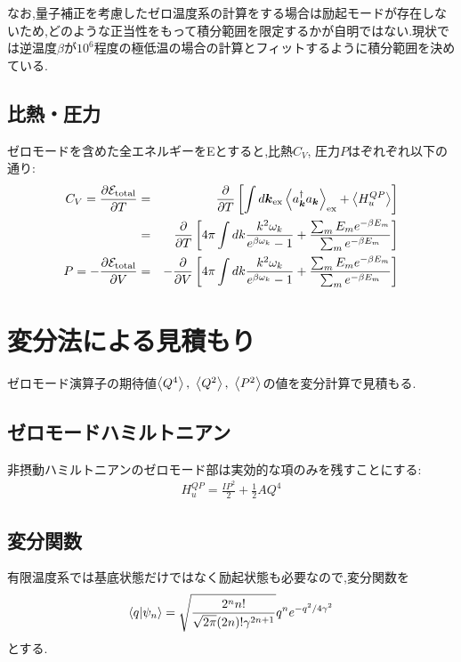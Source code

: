 \documentclass[10.5pt,a4paper]{jreport}
\begin{document}
なお,量子補正を考慮したゼロ温度系の計算をする場合は励起モードが存在しないため,どのような正当性をもって積分範囲を限定するかが自明ではない.現状では逆温度$\beta$が$10^6$程度の極低温の場合の計算とフィットするように積分範囲を決めている.

\subsection{比熱・圧力}
ゼロモードを含めた全エネルギーを{\cal E}とすると,比熱$C_V$, 圧力$P$はぞれぞれ以下の通り:
\begin{eqnarray}
\nonumber  C_V = \frac{\partial {\cal E}_{\rm total}}{\partial T} &=& \frac{\partial}{\partial T}\left[\int d\bm{k} {_{\rm ex}\ev{a^\dagger_{\bm k} a_{\bm k}}_{\rm ex}} + \ev{H_u^{QP}} \right]\\
&=& \frac{\partial}{\partial T}\left[4\pi\int dk \frac{k^2\omega_k}{e^{\beta\omega_k}-1} + \frac{\sum_m E_me^{-\beta E_m}}{\sum_m e^{-\beta E_m}}\right]\\
P = -\frac{\partial {\cal E}_{\rm total}}{\partial V} &=& -\frac{\partial}{\partial V}\left[4\pi\int dk \frac{k^2\omega_k}{e^{\beta\omega_k}-1} + \frac{\sum_m E_me^{-\beta E_m}}{\sum_m e^{-\beta E_m}}\right]
\end{eqnarray}
\section{変分法による見積もり}
ゼロモード演算子の期待値$\ev{Q^4},\ \ev{Q^2},\ \ev{P^2}$の値を変分計算で見積もる.
\subsection{ゼロモードハミルトニアン}
非摂動ハミルトニアンのゼロモード部は実効的な項のみを残すことにする:
\begin{eqnarray}
  H^{QP}_u = \frac{IP^2}{2} + \frac{1}{2}AQ^4
\end{eqnarray}
\subsection{変分関数}
有限温度系では基底状態だけではなく励起状態も必要なので,変分関数を
\begin{eqnarray}
  \ev{q|\psi_n} = \sqrt{\frac{2^nn!}{\sqrt{2\pi}(2n)!\gamma^{2n+1}}} q^ne^{-q^2/4\gamma^2}
\end{eqnarray}
とする.
\end{document}
